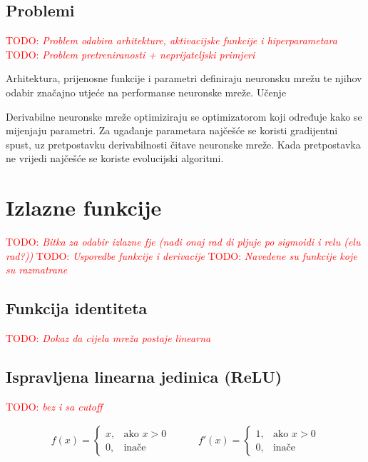\documentclass[times, utf8, diplomski]{fer}
\def\TODO#1{\noindent\textcolor{red}{TODO: \textit{#1}}\newline}
\def\todo#1{\TODO{#1}}
\begin{document}
\subsection{Problemi}
\todo{Problem odabira arhitekture, aktivacijske funkcije i hiperparametara}
\todo{Problem pretreniranosti + neprijateljski primjeri}

Arhitektura, prijenosne funkcije i parametri definiraju neuronsku mrežu te njihov odabir značajno utjeće na performanse neuronske mreže. Učenje 

Derivabilne neuronske mreže optimiziraju se optimizatorom koji određuje kako se mijenjaju parametri. Za ugađanje parametara najčešće se koristi gradijentni spust, uz pretpostavku derivabilnosti čitave neuronske mreže. Kada pretpostavka ne vrijedi najčešće se koriste evolucijski algoritmi.

\section{Izlazne funkcije}
\label{sec:izlazne_fje}
\todo{Bitka za odabir izlazne fje (nađi onaj rad di pljuje po sigmoidi i relu (elu rad?))}
\todo{Usporedbe funkcije i derivacije}
\todo{Navedene su funkcije koje su razmatrane}

\subsection{Funkcija identiteta}

\todo{Dokaz da cijela mreža postaje linearna}

\subsection*{Ispravljena linearna jedinica (ReLU)}

\todo{bez i sa cutoff}

\begin{equation}
\begin{split}
f(x) = 
\begin{cases}
x,		& \text{ako } x > 0 \\
0,		& \text{inače}
\end{cases}
\end{split}
\qquad
\begin{split}
f'(x) = 
\begin{cases}
1,		& \text{ako } x > 0 \\
0,		& \text{inače}
\end{cases}
\end{split}
\end{equation}
\end{document}
